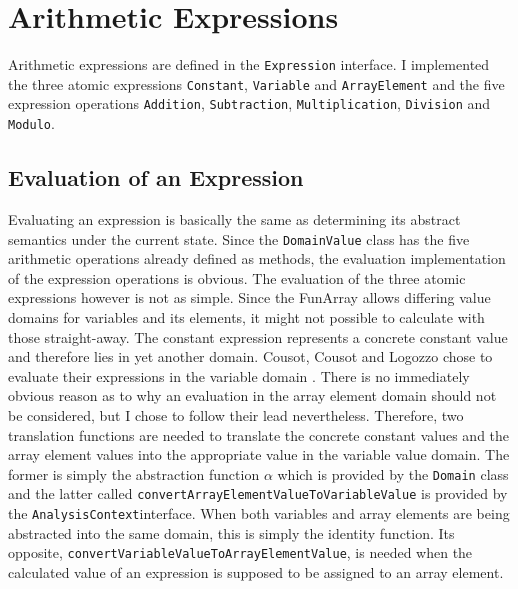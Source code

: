 






\section{Arithmetic Expressions}\label{sec:expressions}

Arithmetic expressions are defined in the \texttt{Expression} interface. I implemented the three atomic expressions \texttt{Constant}, \texttt{Variable} and \texttt{ArrayElement} and the five expression operations \texttt{Addition}, \texttt{Subtraction}, \texttt{Multiplication}, \texttt{Division} and \texttt{Modulo}. 

\subsection{Evaluation of an Expression}\label{sec:expressions:evaluation}
Evaluating an expression is basically the same as determining its abstract semantics under the current state. Since the \texttt{DomainValue} class has the five arithmetic operations already defined as methods, the evaluation implementation of the expression operations is obvious. The evaluation of the three atomic expressions however is not as simple. Since the FunArray allows differing value domains for variables and its elements, it might not possible to calculate with those straight-away. The constant expression represents a concrete constant value and therefore lies in yet another domain. Cousot, Cousot and Logozzo chose to evaluate their expressions in the variable domain \cite{cousot2011}. There is no immediately obvious reason as to why an evaluation in the array element domain should not be considered, but I chose to follow their lead nevertheless. Therefore, two translation functions are needed to translate the concrete constant values and the array element values into the appropriate value in the variable value domain. The former is simply the abstraction function $\alpha$ which is provided by the \texttt{Domain} class and the latter called \texttt{convert\allowbreak{}Array\allowbreak{}Element\allowbreak{}Value\allowbreak{}To\allowbreak{}Variable\allowbreak{}Value} is provided by the \texttt{AnalysisContext}interface. When both variables and array elements are being abstracted into the same domain, this is simply the identity function. Its opposite, \texttt{convert\allowbreak{}Variable\allowbreak{}Value\allowbreak{}ToArray\allowbreak{}Element\allowbreak{}Value}, is needed when the calculated value of an expression is supposed to be assigned to an array element.


